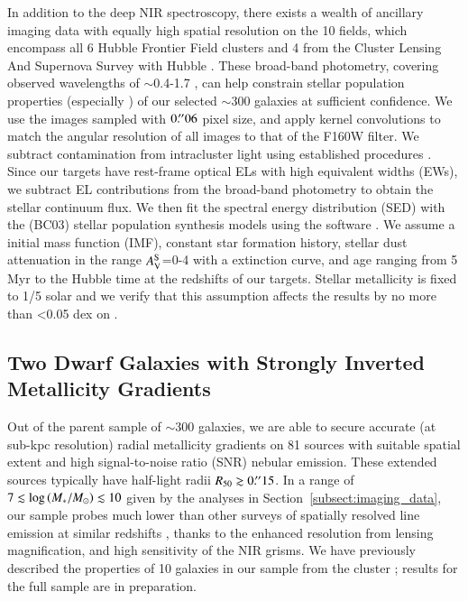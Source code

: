 In addition to the deep NIR spectroscopy, there exists a wealth of ancillary imaging data with equally high spatial resolution on
the 10 \glass fields, which encompass all 6 Hubble Frontier Field \citep[\hff,][]{Lotz:2016ca} clusters and 4 from the Cluster
Lensing And Supernova Survey with Hubble \citep[\clash,][]{Postman:2012ca}.
These broad-band photometry, covering observed wavelengths of $\sim$0.4-1.7 \micron, can help constrain 
stellar population
properties (especially \Mstar) of our selected $\sim$300 galaxies at sufficient confidence.
We use the images sampled with $0\mbox{$.\!^{\prime\prime}$}06$ pixel size, and apply kernel convolutions to match the angular resolution of all images
to that of the F160W filter. We subtract contamination from intracluster light using established procedures 
\citep{Morishita:2016wu}.
Since our targets have rest-frame optical ELs with high equivalent widths (EWs), we subtract EL contributions from
the broad-band photometry to obtain the stellar continuum flux. We then fit the spectral energy 
distribution (SED) with the \citet{Bruzual:2003ck} (BC03) stellar population synthesis models using the software 
\fast\citep{Kriek:2009eo}.
We assume a \citet{Chabrier:2003ki} initial mass function (IMF), constant star formation history, stellar dust attenuation in the
range $A_{\rm V}^{\rm S}$=0-4 with a \citet{Calzetti:2000iy} extinction curve, and age
ranging from 5 Myr to the Hubble time at the redshifts of our targets. Stellar metallicity is fixed to 1/5 solar and we verify that this
assumption affects the results by no more than <0.05 dex on \Mstar.


\subsection{Two Dwarf Galaxies with Strongly Inverted Metallicity Gradients}\label{subsect:galaxy_sample}

Out of the parent sample of $\sim$300 galaxies, we are able to secure accurate (\ie at sub-kpc resolution) 
radial
metallicity gradients on 81 sources with suitable spatial extent and high signal-to-noise ratio (SNR) nebular 
emission.
These extended sources typically have half-light radii $R_{50}\gtrsim0\mbox{$.\!^{\prime\prime}$}15$.
In a range of $7\lesssim\log\left(M_\ast/M_\odot\right)\lesssim10$ given by the analyses in Section~\ref{subsect:imaging_data}, our 
sample probes much lower \Mstar than other surveys of spatially resolved line emission at similar redshifts 
\citep{2016ApJ...827...74W,ForsterSchreiber:2018uq}, thanks to the enhanced resolution from lensing 
magnification, and high sensitivity of the \hst NIR grisms.
We have previously described the properties of 10 galaxies in our
sample from the cluster \clyi \citep{Wang:2016um}; results for the full sample are in preparation.

